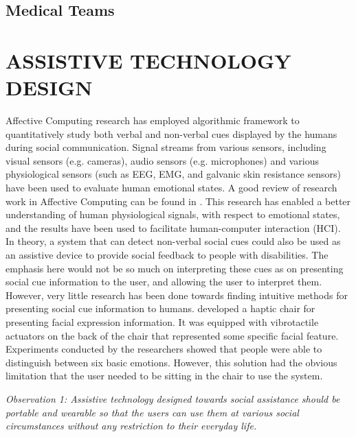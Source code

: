 \documentclass[oneside,11pt]{memoir}
\begin{document}
\section{Medical Teams}






\chapter{ASSISTIVE TECHNOLOGY DESIGN}

\DoubleSpacing
\setlength{\parindent}{.5in}
Affective Computing research has employed algorithmic framework to quantitatively study both verbal and non-verbal cues displayed by the humans during social communication.  Signal streams from various sensors, including visual sensors (e.g. cameras), audio sensors (e.g. microphones) and various physiological sensors (such as EEG, EMG, and galvanic skin resistance sensors) have been used to evaluate human emotional states.  A good review of research work in Affective Computing can be found in \cite{zhihong_zeng_survey_2009}.  This research has enabled a better understanding of human physiological signals, with respect to emotional states, and the results have been used to facilitate human-computer interaction (HCI). In theory, a system that can detect non-verbal social cues could also be used as an assistive device to provide social feedback to people with disabilities.  The emphasis here would not be so much on interpreting these cues as on presenting social cue information to the user, and allowing the user to interpret them.  However, very little research has been done towards finding intuitive methods for presenting social cue information to humans.  \cite{ur_rehman_manifold_2007} developed a haptic chair for presenting facial expression information.  It was equipped with vibrotactile actuators on the back of the chair that represented some specific facial feature. Experiments conducted by the researchers showed that people were able to distinguish between six basic emotions.  However, this solution had the obvious limitation that the user needed to be sitting in the chair to use the system.

\emph{Observation 1: Assistive technology designed towards social assistance should be portable and wearable so that the users can use them at various social circumstances without any restriction to their everyday life.}
\end{document}
